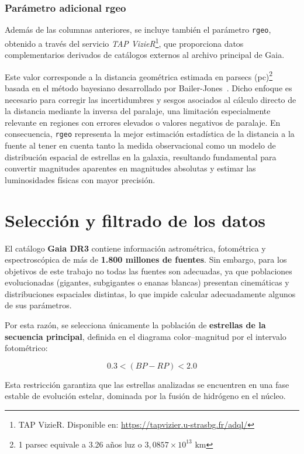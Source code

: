 \subsubsection{Parámetro adicional rgeo}
Además de las columnas anteriores, se incluye también el parámetro \texttt{rgeo}, obtenido a través del servicio \textit{TAP VizieR}\footnote{TAP VizieR. Disponible en: \url{https://tapvizier.u-strasbg.fr/adql/}}, que proporciona datos complementarios derivados de catálogos externos al archivo principal de Gaia.

Este valor corresponde a la distancia geométrica estimada en parsecs (pc)\footnote{1 parsec equivale a 3.26 años luz o $3,0857 \times 10^{13}$ km} basada en el método bayesiano desarrollado por Bailer-Jones~\cite{Bailer-Jones2021}.
Dicho enfoque es necesario para corregir las incertidumbres y sesgos asociados al cálculo directo de la distancia mediante la inversa del paralaje, una limitación especialmente relevante en regiones con errores elevados o valores negativos de paralaje.
En consecuencia, \texttt{rgeo} representa la mejor estimación estadística de la distancia a la fuente al tener en cuenta tanto la medida observacional como un modelo de distribución espacial de estrellas en la galaxia, resultando fundamental para convertir magnitudes aparentes en magnitudes absolutas y estimar las luminosidades físicas con mayor precisión.

\section{Selección y filtrado de los datos}\label{sec:filtrado}
El catálogo \textbf{Gaia DR3} contiene información astrométrica, fotométrica y espectroscópica de más de \textbf{1.800 millones de fuentes}.
Sin embargo, para los objetivos de este trabajo no todas las fuentes son adecuadas, ya que poblaciones evolucionadas (gigantes, subgigantes o enanas blancas) presentan cinemáticas y distribuciones espaciales distintas, lo que impide calcular adecuadamente algunos de sus parámetros.

Por esta razón, se selecciona únicamente la población de \textbf{estrellas de la secuencia principal}, definida en el diagrama color–magnitud por el intervalo fotométrico:

\[
    0.3 < (BP - RP) < 2.0
\]

Esta restricción garantiza que las estrellas analizadas se encuentren en una fase estable de evolución estelar, dominada por la fusión de hidrógeno en el núcleo.

